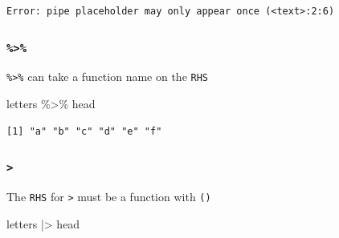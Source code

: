 \documentclass[
  letterpaper,
  DIV=11,
  numbers=noendperiod]{scrreprt}
\newenvironment{Shaded}{\begin{snugshade}}{\end{snugshade}}
\newcommand{\NormalTok}[1]{\textcolor[rgb]{0.00,0.23,0.31}{#1}}
\newcommand{\SpecialCharTok}[1]{\textcolor[rgb]{0.37,0.37,0.37}{#1}}
\begin{document}
\begin{tcolorbox}
\begin{tcolorbox}
\begin{verbatim}
Error: pipe placeholder may only appear once (<text>:2:6)
\end{verbatim}

\end{tcolorbox}

\begin{tcolorbox}[enhanced jigsaw, left=2mm, colframe=quarto-callout-note-color-frame, leftrule=.75mm, opacitybacktitle=0.6, toptitle=1mm, title=\textcolor{quarto-callout-note-color}{\faInfo}\hspace{0.5em}{Note}, opacityback=0, coltitle=black, colbacktitle=quarto-callout-note-color!10!white, breakable, colback=white, titlerule=0mm, bottomrule=.15mm, arc=.35mm, bottomtitle=1mm, rightrule=.15mm, toprule=.15mm]

\hypertarget{section-2}{%
\subsubsection{\texorpdfstring{\texttt{\%\textgreater{}\%}}{\%\textgreater\%}}\label{section-2}}

\texttt{\%\textgreater{}\%} can take a function name on the \texttt{RHS}

\begin{Shaded}
\begin{Highlighting}[]
\NormalTok{letters }\SpecialCharTok{\%\textgreater{}\%}\NormalTok{ head}
\end{Highlighting}
\end{Shaded}

\begin{verbatim}
[1] "a" "b" "c" "d" "e" "f"
\end{verbatim}

\hypertarget{section-3}{%
\subsubsection{\texorpdfstring{\texttt{\textbar{}\textgreater{}}}{\textbar\textgreater{}}}\label{section-3}}

The \texttt{RHS} for \texttt{\textbar{}\textgreater{}} must be a
function with \texttt{()}

\begin{Shaded}
\begin{Highlighting}[]
\NormalTok{letters }\SpecialCharTok{|\textgreater{}}\NormalTok{ head}
\end{Highlighting}
\end{Shaded}


\end{tcolorbox}
\end{tcolorbox}
\end{document}
